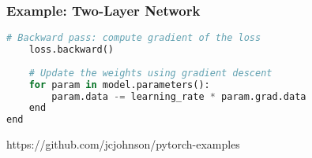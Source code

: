 \begin{frame}[fragile]
\MyLogo
\frametitle{Example: Two-Layer Network}  

\ContinueLineNumber
\begin{lstlisting}[language=python]         
	# Backward pass: compute gradient of the loss
	loss.backward()
         
	# Update the weights using gradient descent
	for param in model.parameters():
		param.data -= learning_rate * param.grad.data
	end
end
\end{lstlisting}

\begin{center}
{\color{red}\scriptsize
https://github.com/jcjohnson/pytorch-examples
}
\end{center}

\end{frame}